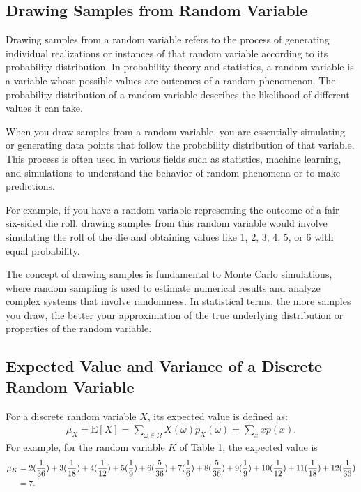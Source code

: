 \documentclass{tufte-handout}
\begin{document}
\subsection{Drawing Samples from  Random Variable}

Drawing samples from a random variable refers to the process of generating individual realizations or instances of that random variable according to its probability distribution. In probability theory and statistics, a random variable is a variable whose possible values are outcomes of a random phenomenon. The probability distribution of a random variable describes the likelihood of different values it can take.

When you draw samples from a random variable, you are essentially simulating or generating data points that follow the probability distribution of that variable. This process is often used in various fields such as statistics, machine learning, and simulations to understand the behavior of random phenomena or to make predictions.

For example, if you have a random variable representing the outcome of a fair six-sided die roll, drawing samples from this random variable would involve simulating the roll of the die and obtaining values like 1, 2, 3, 4, 5, or 6 with equal probability.

The concept of drawing samples is fundamental to Monte Carlo simulations, where random sampling is used to estimate numerical results and analyze complex systems that involve randomness. In statistical terms, the more samples you draw, the better your approximation of the true underlying distribution or properties of the random variable.

\subsection{Expected Value and Variance of a Discrete Random Variable}

For a discrete random variable  $X$, its expected value is defined as:
\begin{align*}
\mu_X = \mathrm E\left[X\right] = \sum_{\omega \in \Omega} X(\omega) p_X(\omega) = \sum_x xp(x).
\end{align*}
For example, for the random variable $K$ of Table 1, the expected value is
\begin{align*}
\small
 \mu_K &= 2(\frac{1}{36})+3(\frac{1}{18})+4(\frac{1}{12})+5(\frac{1}{9})+6(\frac{5}{36})+7(\frac{1}{6})+8(\frac{5}{36})+9(\frac{1}{9})+10(\frac{1}{12})+11(\frac{1}{18})+ 12(\frac{1}{36}) \\
&= 7.
\end{align*}
\end{document}
